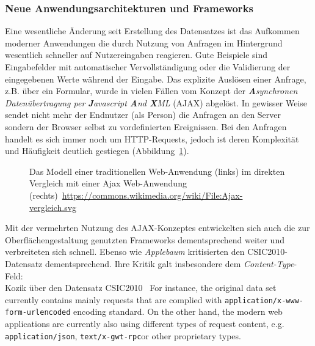 \subsubsection{Neue Anwendungsarchitekturen und Frameworks}
\label{sec:neueframeworks}
Eine wesentliche Änderung seit Erstellung des Datensatzes ist das Aufkommen moderner Anwendungen die durch Nutzung von Anfragen im Hintergrund wesentlich schneller auf Nutzereingaben reagieren. Gute Beispiele sind Eingabefelder mit automatischer Vervollständigung oder die Validierung der eingegebenen Werte während der Eingabe. Das explizite Auslösen einer Anfrage, z.B. über ein Formular, wurde in vielen Fällen vom Konzept der \emph{\textbf{A}synchronen Datenübertragung per \textbf{J}avascript \textbf{A}nd \textbf{X}ML} (AJAX) abgelöst. In gewisser Weise sendet nicht mehr der Endnutzer (als Person) die Anfragen an den Server sondern der Browser selbst zu vordefinierten Ereignissen. Bei den Anfragen handelt es sich immer noch um HTTP-Requests, jedoch ist deren Komplexität und Häufigkeit deutlich gestiegen (Abbildung~\ref{fig:ajax}).

\begin{figure}[h]
  \centering
  
  \caption{Das Modell einer traditionellen Web-Anwendung (links) im direkten Vergleich mit einer Ajax Web-Anwendung (rechts)~\url{https://commons.wikimedia.org/wiki/File:Ajax-vergleich.svg}}
  \label{fig:ajax}
\end{figure}


Mit der vermehrten Nutzung des AJAX-Konzeptes entwickelten sich auch die zur Oberflächengestaltung genutzten Frameworks dementsprechend weiter und verbreiteten sich schnell. Ebenso wie \emph{Applebaum} kritisierten \cite{kozik2019} den CSIC2010-Datensatz dementsprechend. Ihre Kritik galt insbesondere dem \glqq\emph{Content-Type}\grqq-Feld:\\

\textcolor{bhtGray}{ Kozik über den Datensatz CSIC2010~\cite{kozik2019}} For instance, the original data set currently contains mainly requests that are complied with \glqq\verb=application/x-www-form-urlencoded=\grqq{} 
encoding standard. On the other hand, the modern web applications are currently also using different types of request content, e.g. \glqq\verb=application/json=\grqq, \glqq\verb=text/x-gwt-rpc=\grqq or other proprietary types.\\


